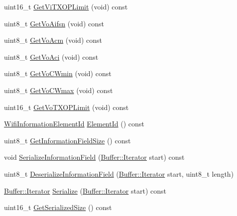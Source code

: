 \begin{DoxyCompactItemize}
\item 
uint16\+\_\+t \hyperlink{classns3_1_1EdcaParameterSet_a2482953a450a559f881b4a0ca8ca1223}{Get\+Vi\+T\+X\+O\+P\+Limit} (void) const 
\item 
uint8\+\_\+t \hyperlink{classns3_1_1EdcaParameterSet_ae6574fcd2cf16cb127311518f3ab26b1}{Get\+Vo\+Aifsn} (void) const 
\item 
uint8\+\_\+t \hyperlink{classns3_1_1EdcaParameterSet_aacb9c8c0c50168fddad92a1dc103bff4}{Get\+Vo\+Acm} (void) const 
\item 
uint8\+\_\+t \hyperlink{classns3_1_1EdcaParameterSet_a8de5f5628879cc95b226e0e116531301}{Get\+Vo\+Aci} (void) const 
\item 
uint8\+\_\+t \hyperlink{classns3_1_1EdcaParameterSet_a16b72b4c7cd838c129b938717abe186a}{Get\+Vo\+C\+Wmin} (void) const 
\item 
uint8\+\_\+t \hyperlink{classns3_1_1EdcaParameterSet_a811e3a1d9a9074575f3f4ec34e750e8e}{Get\+Vo\+C\+Wmax} (void) const 
\item 
uint16\+\_\+t \hyperlink{classns3_1_1EdcaParameterSet_a81466f2a90aa35780298372691cdcaf1}{Get\+Vo\+T\+X\+O\+P\+Limit} (void) const 
\item 
\hyperlink{namespacens3_aeb185e0c8a60816016bca079f1420478}{Wifi\+Information\+Element\+Id} \hyperlink{classns3_1_1EdcaParameterSet_afe0c10fcfaf0911e22e4e9e27499b1f7}{Element\+Id} () const 
\item 
uint8\+\_\+t \hyperlink{classns3_1_1EdcaParameterSet_a28423dbdc229293c297c8476a788a88e}{Get\+Information\+Field\+Size} () const 
\item 
void \hyperlink{classns3_1_1EdcaParameterSet_a685967c8b646f0f6d5a057d7fccd9859}{Serialize\+Information\+Field} (\hyperlink{classns3_1_1Buffer_1_1Iterator}{Buffer\+::\+Iterator} start) const 
\item 
uint8\+\_\+t \hyperlink{classns3_1_1EdcaParameterSet_ac223153808caa0e52fd12ba13b9e104a}{Deserialize\+Information\+Field} (\hyperlink{classns3_1_1Buffer_1_1Iterator}{Buffer\+::\+Iterator} start, uint8\+\_\+t length)
\item 
\hyperlink{classns3_1_1Buffer_1_1Iterator}{Buffer\+::\+Iterator} \hyperlink{classns3_1_1EdcaParameterSet_ae0ef4ff2e5549a3c0a2fa12cc73af425}{Serialize} (\hyperlink{classns3_1_1Buffer_1_1Iterator}{Buffer\+::\+Iterator} start) const 
\item 
uint16\+\_\+t \hyperlink{classns3_1_1EdcaParameterSet_afeb47d7db982d4026cf15a5b24fb3e91}{Get\+Serialized\+Size} () const 
\end{DoxyCompactItemize}
